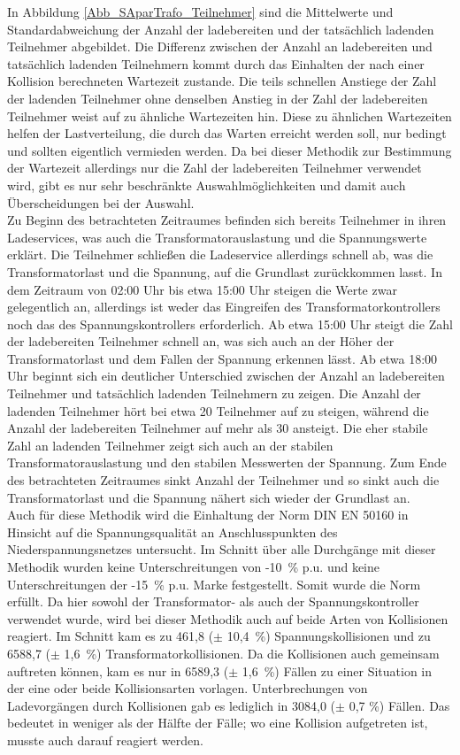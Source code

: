 In Abbildung \ref{Abb_SAparTrafo_Teilnehmer} sind die Mittelwerte und Standardabweichung der Anzahl der ladebereiten und der tatsächlich ladenden Teilnehmer abgebildet. Die Differenz zwischen der Anzahl an ladebereiten und tatsächlich ladenden Teilnehmern kommt durch das Einhalten der nach einer Kollision berechneten Wartezeit zustande. Die teils schnellen Anstiege der Zahl der ladenden Teilnehmer ohne denselben Anstieg in der Zahl der ladebereiten Teilnehmer weist auf zu ähnliche Wartezeiten hin. Diese zu ähnlichen Wartezeiten helfen der Lastverteilung, die durch das Warten erreicht werden soll, nur bedingt und sollten eigentlich vermieden werden. Da bei dieser Methodik zur Bestimmung der Wartezeit allerdings nur die Zahl der ladebereiten Teilnehmer verwendet wird, gibt es nur sehr beschränkte Auswahlmöglichkeiten und damit auch Überscheidungen bei der Auswahl.\\
Zu Beginn des betrachteten Zeitraumes befinden sich bereits Teilnehmer in ihren Ladeservices, was auch die Transformatorauslastung und die Spannungswerte erklärt. Die Teilnehmer schließen die Ladeservice allerdings schnell ab, was die Transformatorlast und die Spannung, auf die Grundlast zurückkommen lasst. In dem Zeitraum von 02:00 Uhr bis etwa 15:00 Uhr steigen die Werte zwar gelegentlich an, allerdings ist weder das Eingreifen des Transformatorkontrollers noch das des Spannungskontrollers erforderlich. Ab etwa 15:00 Uhr steigt die Zahl der ladebereiten Teilnehmer schnell an, was sich auch an der Höher der Transformatorlast und dem Fallen der Spannung erkennen lässt. Ab etwa 18:00 Uhr beginnt sich ein deutlicher Unterschied zwischen der Anzahl an ladebereiten Teilnehmer und tatsächlich ladenden Teilnehmern zu zeigen. Die Anzahl der ladenden Teilnehmer hört bei etwa 20 Teilnehmer auf zu steigen, während die Anzahl der ladebereiten Teilnehmer auf mehr als 30 ansteigt. Die eher stabile Zahl an ladenden Teilnehmer zeigt sich auch an der stabilen Transformatorauslastung und den stabilen Messwerten der Spannung. Zum Ende des betrachteten Zeitraumes sinkt Anzahl der Teilnehmer und so sinkt auch die Transformatorlast und die Spannung nähert sich wieder der Grundlast an.\\
Auch für diese Methodik wird die Einhaltung der Norm DIN EN 50160 in Hinsicht auf die Spannungsqualität an Anschlusspunkten des Niederspannungsnetzes untersucht. Im Schnitt über alle Durchgänge mit dieser Methodik wurden keine Unterschreitungen von -10~\% p.u. und keine Unterschreitungen der -15~\% p.u. Marke festgestellt. Somit wurde die Norm erfüllt.
Da hier sowohl der Transformator- als auch der Spannungskontroller verwendet wurde, wird bei dieser Methodik auch auf beide Arten von Kollisionen reagiert. Im Schnitt kam es zu 461,8 ($\pm$ 10,4~\%) Spannungskollisionen und zu 6588,7 ($\pm$ 1,6~\%) Transformatorkollisionen. Da die Kollisionen auch gemeinsam auftreten können, kam es nur in 6589,3 ($\pm$ 1,6~\%) Fällen zu einer Situation in der eine oder beide Kollisionsarten vorlagen. Unterbrechungen von Ladevorgängen durch Kollisionen gab es lediglich in 3084,0 ($\pm$ 0,7 \%) Fällen. Das bedeutet in weniger als der Hälfte der Fälle; wo eine Kollision aufgetreten ist, musste auch darauf reagiert werden.\\
